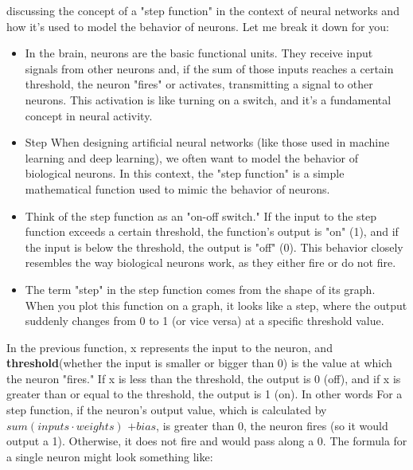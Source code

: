 discussing the concept of a "step function" in the context of neural networks and how it's used to model the behavior of neurons. Let me break it down for you:

\begin{itemize}
    \item In the brain, neurons are the basic functional units. They receive input signals from other neurons and, if the sum of those inputs reaches a certain threshold, the neuron "fires" or activates, transmitting a signal to other neurons. This activation is like turning on a switch, and it's a fundamental concept in neural activity.
    \item Step  When designing artificial neural networks (like those used in machine learning and deep learning), we often want to model the behavior of biological neurons. In this context, the "step function" is a simple mathematical function used to mimic the behavior of neurons.
    \item Think of the step function as an "on-off switch." If the input to the step function exceeds a certain threshold, the function's output is "on" (1), and if the input is below the threshold, the output is "off" (0). This behavior closely resembles the way biological neurons work, as they either fire or do not fire.
    \item The term "step" in the step function comes from the shape of its graph. When you plot this function on a graph, it looks like a step, where the output suddenly changes from 0 to 1 (or vice versa) at a specific threshold value.
\end{itemize}

In the previous function, x represents the input to the neuron, and \textbf{threshold}(whether the input is smaller or bigger than 0) is the value at which the neuron "fires." If x is less than the threshold, the output is 0 (off), and if x is greater than or equal to the threshold, the output is 1 (on).
In other words
For a step function, if the neuron’s output value, which is calculated by $sum(inputs\cdot weights)$
$+ bias$, is greater than 0, the neuron fires (so it would output a 1). Otherwise, it does not fire
and would pass along a 0. The formula for a single neuron might look something like:

